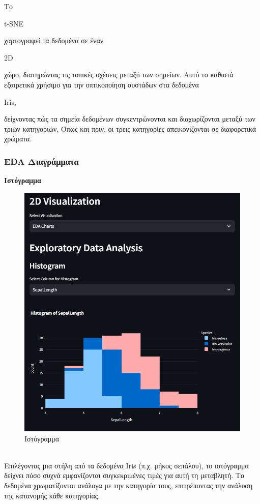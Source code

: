 \documentclass{article}
\begin{document}
\vspace{0.3 cm}
Το {t-SNE {χαρτογραφεί τα δεδομένα σε έναν {2D {χώρο, διατηρώντας τις τοπικές σχέσεις μεταξύ των σημείων. Αυτό το καθιστά εξαιρετικά χρήσιμο για την οπτικοποίηση συστάδων στα δεδομένα {Iris,{ δείχνοντας πώς τα σημεία δεδομένων συγκεντρώνονται και διαχωρίζονται μεταξύ των τριών κατηγοριών. Όπως και πριν, οι τρεις κατηγορίες απεικονίζονται σε διαφορετικά χρώματα.
\newpage

\subsubsection{EDA Διαγράμματα}
\vspace{0.3 cm}
\textbf{Ιστόγραμμα}
\begin{figure}[h!]
  \centering
  \includegraphics[width=0.6\textheight]{photos/histogram.png}
  \caption{Ιστόγραμμα}
  \label{fig:Histogram}
\end{figure}
\\ \vspace{0.3 cm}
Επιλέγοντας μια στήλη από τα δεδομένα Iris (π.χ. μήκος σεπάλου), το ιστόγραμμα δείχνει πόσο συχνά εμφανίζονται συγκεκριμένες τιμές για αυτή τη μεταβλητή. Τα δεδομένα χρωματίζονται ανάλογα με την κατηγορία τους, επιτρέποντας την ανάλυση της κατανομής κάθε κατηγορίας.
\newpage

}}}}}}
\end{document}
